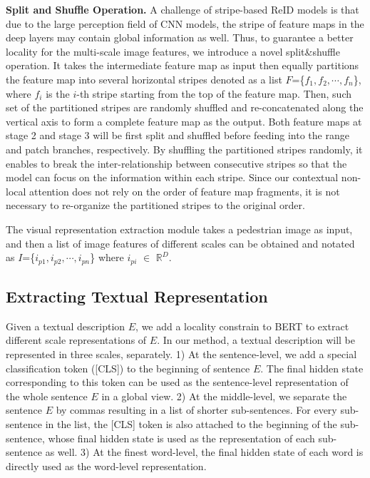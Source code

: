 \documentclass[final]{cvpr}
\begin{document}
\textbf{Split and Shuffle Operation.} A challenge of stripe-based ReID models is that due to the large perception field of CNN models, the stripe of feature maps in the deep layers may contain global information as well. 
Thus, to guarantee a better locality for the multi-scale image features, we introduce a novel split\&shuffle operation.  
It takes the intermediate feature map as input then equally partitions the feature map into several horizontal stripes denoted as a list $F$=\{$f_{1}, f_{2}, \cdots, f_{n}$\}, where $f_i$ is the $i$-th stripe starting from the top of the feature map.  
Then, such set of the partitioned stripes are randomly shuffled and re-concatenated along the vertical axis to form a complete feature map as the output. 
Both feature maps at stage 2 and stage 3 will be first split and shuffled before feeding into the range and patch branches, respectively. 
By shuffling the partitioned stripes randomly, it enables to break the inter-relationship between consecutive stripes so that the model can focus on the information within each stripe. 
Since our contextual non-local attention does not rely on the order of feature map fragments, it is not necessary to re-organize the partitioned stripes to the original order. 




The visual representation extraction module takes a pedestrian image as input, and then a list of image features of different scales can be obtained and notated as $I$=\{$i_{p1},i_{p2}, \cdots, i_{pn}$\} where $i_{pi}$ $\in$ $\mathbb{R}^{D}$.


\subsection{Extracting Textual Representation}
Given a textual description $E$, we add a locality constrain to BERT to extract different scale representations of $E$. 
In our method, a textual description will be represented in three scales, separately. 
1) At the sentence-level, we add a special classification token ([CLS]) to the beginning of sentence $E$. The final hidden state corresponding to this token can be used as the sentence-level representation of the whole sentence $E$ in a global view. 
2) At the middle-level, we separate the sentence $E$ by commas resulting in a list of shorter sub-sentences. For every sub-sentence in the list, the [CLS] token is also attached to the beginning of the sub-sentence, whose final hidden state is used as the representation of each sub-sentence as well. 
3) At the finest word-level, the final hidden state of each word is directly used as the word-level representation.
\end{document}
